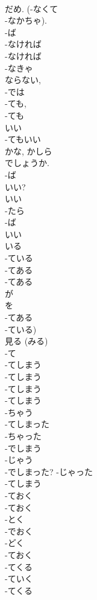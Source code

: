 \documentclass[8pt]{extreport}
\begin{document}
\begin{CJK}{UTF8}{min}
\\	だめ. (-なくて 
\\	-なかちゃ). 
\\	-ば 
\\	-なければ 
\\	-なければ 
\\	-なきゃ 
\\	ならない, 
\\	-では 
\\	-ても, 
\\	-ても 
\\	いい	
\\	-てもいい 
\\	かな, かしら 
\\	でしょうか.	
\\	-ば 
\\	いい?	
\\	いい 
\\	-たら 
\\	-ば 
\\	いい	
\\	いる 
\\	-ている 
\\	-てある 
\\	-てある 
\\	が 
\\	を	
\\	-てある 
\\	-ている)	
\\	見る (みる) 
\\	-て 
\\	-てしまう	
\\	-てしまう	
\\	-てしまう	
\\	-てしまう 
\\	-ちゃう	
\\	-てしまった 
\\	-ちゃった	
\\	-でしまう 
\\	-じゃう	
\\	-でしまった?	-じゃった	
\\	-てしまう	
\\	-ておく	
\\	-ておく 
\\	-とく	
\\	-でおく 
\\	-どく	
\\	-ておく	
\\	-てくる	
\\	-ていく	
\\	-てくる 

\end{CJK}
\end{document}
